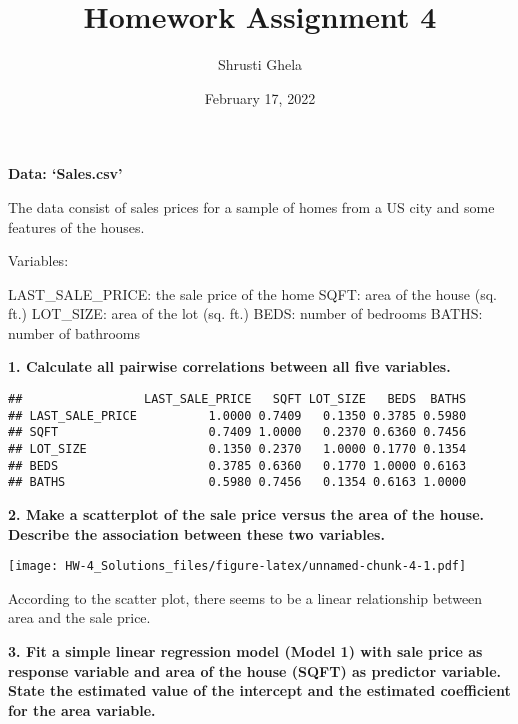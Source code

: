 \documentclass[
]{article}
\title{Homework Assignment 4}
\author{Shrusti Ghela}
\date{February 17, 2022}
\newenvironment{Shaded}{\begin{snugshade}}{\end{snugshade}}
\newcommand{\AttributeTok}[1]{\textcolor[rgb]{0.77,0.63,0.00}{#1}}
\newcommand{\DecValTok}[1]{\textcolor[rgb]{0.00,0.00,0.81}{#1}}
\newcommand{\FunctionTok}[1]{\textcolor[rgb]{0.00,0.00,0.00}{#1}}
\newcommand{\NormalTok}[1]{#1}
\newcommand{\SpecialCharTok}[1]{\textcolor[rgb]{0.00,0.00,0.00}{#1}}
\newcommand{\StringTok}[1]{\textcolor[rgb]{0.31,0.60,0.02}{#1}}
\begin{document}
\maketitle

\textbf{Data: `Sales.csv'}

The data consist of sales prices for a sample of homes from a US city
and some features of the houses.

Variables:

LAST\_SALE\_PRICE: the sale price of the home SQFT: area of the house
(sq. ft.) LOT\_SIZE: area of the lot (sq. ft.) BEDS: number of bedrooms
BATHS: number of bathrooms

\textbf{1. Calculate all pairwise correlations between all five
variables. }

\begin{verbatim}
##                 LAST_SALE_PRICE   SQFT LOT_SIZE   BEDS  BATHS
## LAST_SALE_PRICE          1.0000 0.7409   0.1350 0.3785 0.5980
## SQFT                     0.7409 1.0000   0.2370 0.6360 0.7456
## LOT_SIZE                 0.1350 0.2370   1.0000 0.1770 0.1354
## BEDS                     0.3785 0.6360   0.1770 1.0000 0.6163
## BATHS                    0.5980 0.7456   0.1354 0.6163 1.0000
\end{verbatim}

\textbf{2. Make a scatterplot of the sale price versus the area of the
house. Describe the association between these two variables.}

\begin{Shaded}
\end{Shaded}

\texttt{[image: HW-4\_Solutions\_files/figure-latex/unnamed-chunk-4-1.pdf]}

According to the scatter plot, there seems to be a linear relationship
between area and the sale price.

\textbf{3. Fit a simple linear regression model (Model 1) with sale
price as response variable and area of the house (SQFT) as predictor
variable. State the estimated value of the intercept and the estimated
coefficient for the area variable.}
\end{document}
